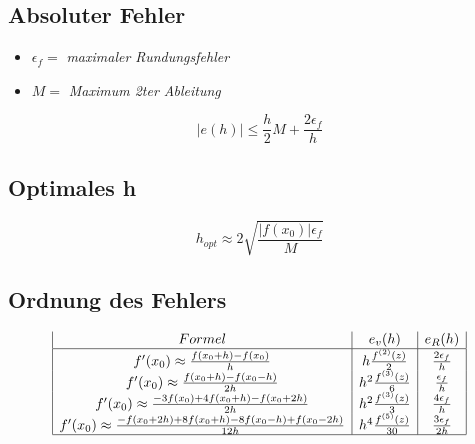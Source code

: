 \subsection{Absoluter Fehler}
\begin{itemize}
	\item $\epsilon_f = $ \textit{maximaler Rundungsfehler} \\
	\item $M = $ \textit{Maximum 2ter Ableitung} \\
\end{itemize}

\begin{equation*}
	|e(h)| \leq \frac{h}{2} M + \frac{2\epsilon_f}{h}
\end{equation*}

\subsection{Optimales h}
\begin{equation*}
	h_{opt} \approx 2 \sqrt{\frac{|f(x_0)| \epsilon_f}{M}}
\end{equation*}

\subsection{Ordnung des Fehlers}
\begin{displaymath}
	\begin{array}{| c | c | c |}
		Formel & e_v(h) & e_R(h) \\
		\hline
		f'(x_0) \approx \frac{f(x_0 + h) - f(x_0)}{h} & h \frac{f^{(2)}(z)}{2} & \frac{2\epsilon_f}{h} \\
		f'(x_0) \approx \frac{f(x_0 + h) - f(x_0 - h)}{2h} & h^2 \frac{f^{(3)}(z)}{6} & \frac{\epsilon_f}{h} \\
		f'(x_0) \approx \frac{-3f(x_0) + 4f(x_0 + h) - f(x_0 + 2h)}{2h} & h^2 \frac{f^{(3)}(z)}{3} & \frac{4\epsilon_f}{h} \\
		f'(x_0) \approx \frac{-f(x_0 + 2h) + 8f(x_0+h) -8f(x_0-h) + f(x_0-2h)}{12h} & h^4 \frac{f^{(5)}(z)}{30} & \frac{3\epsilon_f}{2h} \\
		\hline
	\end{array}
\end{displaymath}